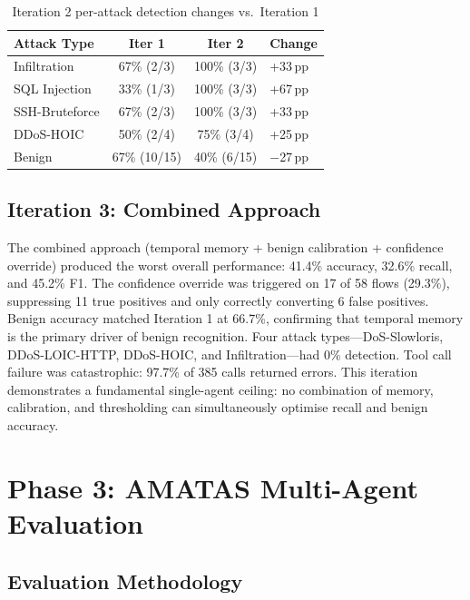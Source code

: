 \documentclass[12pt, a4paper, oneside]{report}
\begin{document}
\begin{table}[H]
\centering
\caption{Iteration 2 per-attack detection changes vs.\ Iteration 1}
\label{tab:iter2-changes}
\begin{tabular}{@{}lccl@{}}
\toprule
\textbf{Attack Type} & \textbf{Iter 1} & \textbf{Iter 2} & \textbf{Change} \\
\midrule
Infiltration     & 67\% (2/3) & 100\% (3/3) & +33\,pp \\
SQL Injection    & 33\% (1/3) & 100\% (3/3) & +67\,pp \\
SSH-Bruteforce   & 67\% (2/3) & 100\% (3/3) & +33\,pp \\
DDoS-HOIC        & 50\% (2/4) &  75\% (3/4) & +25\,pp \\
\midrule
Benign           & 67\% (10/15) & 40\% (6/15) & $-$27\,pp \\
\bottomrule
\end{tabular}
\end{table}

\subsection{Iteration 3: Combined Approach}

The combined approach (temporal memory + benign calibration + confidence override)
produced the worst overall performance: 41.4\% accuracy, 32.6\% recall, and
45.2\% F1. The confidence override was triggered on 17 of 58 flows (29.3\%),
suppressing 11 true positives and only correctly converting 6 false positives.
Benign accuracy matched Iteration 1 at 66.7\%, confirming that temporal memory
is the primary driver of benign recognition. Four attack types---DoS-Slowloris,
DDoS-LOIC-HTTP, DDoS-HOIC, and Infiltration---had 0\% detection.
Tool call failure was catastrophic: 97.7\% of 385 calls returned errors.
This iteration demonstrates a fundamental single-agent ceiling: no combination
of memory, calibration, and thresholding can simultaneously optimise recall
and benign accuracy.


\section{Phase 3: AMATAS Multi-Agent Evaluation}
\label{sec:phase3-results}

\subsection{Evaluation Methodology}
\end{document}
